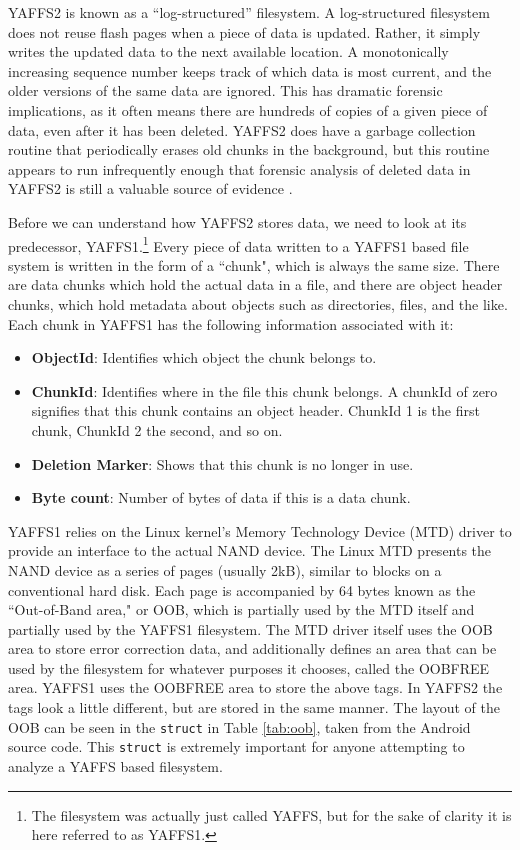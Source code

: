 YAFFS2 is known as a ``log-structured'' filesystem.  A log-structured filesystem does not reuse flash pages when a piece of data is
updated.  Rather, it simply writes the updated data to the next available location.  A monotonically increasing sequence number
keeps track of which data is most current, and the older versions of the same data are ignored.  This has dramatic forensic
implications, as it often means there are hundreds of copies of a given piece of data, even after it has been deleted.  YAFFS2 does
have a garbage collection routine that periodically erases old chunks in the background, but this routine appears to run
infrequently enough that forensic analysis of deleted data in YAFFS2 is still a valuable source of evidence \cite{naval}. 

Before we can understand how YAFFS2 stores data, we need to look at its predecessor, YAFFS1.\footnote{The filesystem was actually
just called YAFFS, but for the sake of clarity it is here referred to as YAFFS1.} Every piece of data written to a YAFFS1 based file
system is written in the form of a ``chunk", which is always the same size.  There are data chunks which hold the actual data in a
file, and there are object header chunks, which hold metadata about objects such as directories, files, and the like.  Each chunk in
YAFFS1 has the following information associated with it:

\begin{itemize}
	\item {\bf ObjectId}: Identifies which object the chunk belongs to.\
	\item {\bf ChunkId}: Identifies where in the file this chunk belongs. 
		A chunkId of zero signifies that this chunk contains an object header. 
		ChunkId 1 is the first chunk, ChunkId 2 the second, and so on.
	\item {\bf Deletion Marker}: Shows that this chunk is no longer in use.
	\item {\bf Byte count}: Number of bytes of data if this is a data chunk.
\end{itemize}
\cite{howyaffsworks}

YAFFS1 relies on the Linux kernel's Memory Technology Device (MTD) driver to provide an interface to the actual NAND device.  The
Linux MTD presents the NAND device as a series of pages (usually 2kB), similar to blocks on a conventional hard disk.  Each page is
accompanied by 64 bytes known as the ``Out-of-Band area," or OOB, which is partially used by the MTD itself and partially used by the
YAFFS1 filesystem. The MTD driver itself uses the OOB area to store error correction data, and additionally defines an area that can
be used by the filesystem for whatever purposes it chooses, called the OOBFREE area.  YAFFS1 uses the OOBFREE area to store the
above tags. In YAFFS2 the tags look a little different, but are stored in the same manner. The layout of the OOB can be seen in
the \texttt{struct} in Table \ref{tab:oob}, taken from the Android source code. This \texttt{struct} is extremely important for
anyone attempting to analyze a YAFFS based filesystem.

